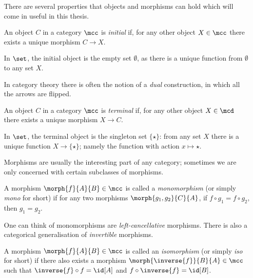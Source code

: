There are several properties that objects and morphisms can hold which will come
in useful in this thesis.

\begin{definition}
    An object \(C\) in a category \(\mcc\) is \emph{initial} if, for any other
    object \(X \in \mcc\) there exists a unique morphism \(C \to X\).
\end{definition}

\begin{example}
    In \(\set\), the initial object is the empty set \(\emptyset\), as there is
    a unique function from \(\emptyset\) to any set \(X\).
\end{example}

In category theory there is often the notion of a \emph{dual} construction, in
which all the arrows are flipped.

\begin{definition}
    An object \(C\) in a category \(\mcc\) is \emph{terminal} if, for any other
    object \(X \in \mcd\) there exists a unique morphism \(X \to C\).
\end{definition}

\begin{example}
    In \(\set\), the terminal object is the singleton set \(\{\star\}\):
    from any set \(X\) there is a unique function \(X \to \{\star\}\); namely
    the function with action \(x \mapsto \star\).
\end{example}

Morphisms are usually the interesting part of any category; sometimes we are
only concerned with certain subclasses of morphisms.

\begin{definition}[Monomorphism]
    A morphism \(\morph{f}{A}{B} \in \mcc\) is called a \emph{monomorphism} (or
    simply \emph{mono} for short) if for any two morphisms
    \(\morph{g_1,g_2}{C}{A}\), if \(f \circ g_1 = f \circ g_2\), then
    \(g_1 = g_2\).
\end{definition}

One can think of monomorphisms are \emph{left-cancellative} morphisms.
There is also a categorical generalisation of \emph{invertible} morphisms.

\begin{definition}[Isomorphism]
    A morphism \(\morph{f}{A}{B} \in \mcc\) is called an \emph{isomorphism} (or
    simply \emph{iso} for short) if there also exists a morphism \(
        \morph{\inverse{f}}{B}{A} \in \mcc
    \) such that \(
        \inverse{f} \circ f = \id[A]
    \) and \(
        f \circ \inverse{f} = \id[B]
    \).
\end{definition}

